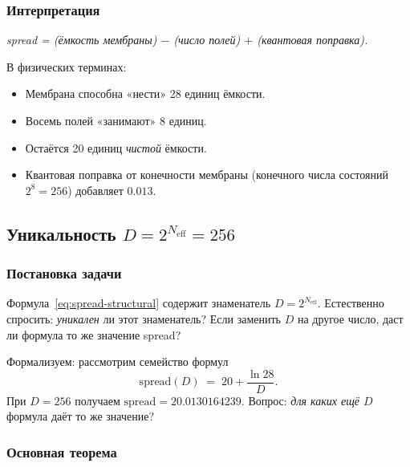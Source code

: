 \documentclass[11pt,a4paper]{article}
\theoremstyle{definition}
\begin{document}
\subsubsection{Интерпретация}

\begin{center}
\emph{spread = (ёмкость мембраны) $-$ (число полей)
$+$ (квантовая поправка).}
\end{center}

\medskip\noindent
В физических терминах:
\begin{itemize}
    \item Мембрана способна «нести» 28 единиц ёмкости.
    \item Восемь полей «занимают» 8 единиц.
    \item Остаётся 20 единиц \emph{чистой} ёмкости.
    \item Квантовая поправка от конечности мембраны
          (конечного числа состояний $2^8 = 256$) добавляет
          $0.013$.
\end{itemize}

\subsection{Уникальность \texorpdfstring{$D = 2^{N_{\text{eff}}} = 256$}{D = 2\^{}N\_eff = 256}}
\label{subsec:spread-uniqueness}

\subsubsection{Постановка задачи}

Формула~\eqref{eq:spread-structural} содержит знаменатель
$D = 2^{N_{\text{eff}}}$. Естественно спросить: \emph{уникален}
ли этот знаменатель? Если заменить $D$ на другое число,
даст ли формула то же значение spread?

\medskip\noindent
Формализуем: рассмотрим семейство формул
\begin{equation}
    \text{spread}(D) \;=\; 20 + \frac{\ln 28}{D}.
    \label{eq:spread-family}
\end{equation}
При $D = 256$ получаем $\text{spread} = 20.0130164239$.
Вопрос: \emph{для каких ещё $D$} формула даёт то же значение?

\subsubsection{Основная теорема}
\end{document}
